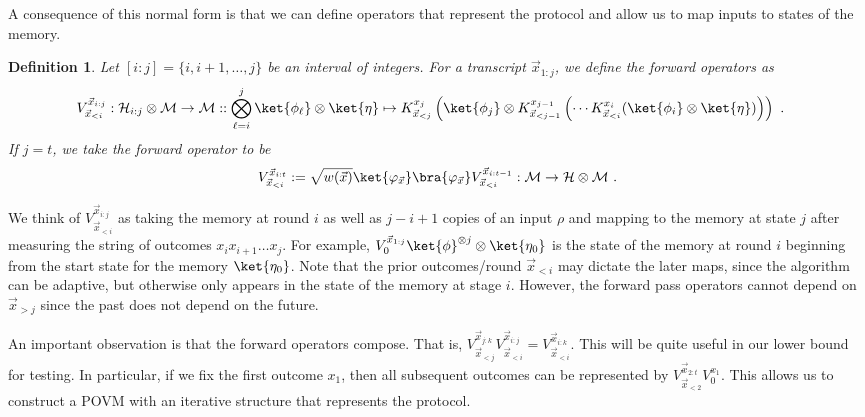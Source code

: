 \documentclass[11pt]{article}
\newtheorem{definition}[theorem]{Definition}
\newcommand{\xll}{\vec{x}_{<i}}
\newcommand{\Hc}{\mathcal{H}}
\newcommand{\Mc}{\mathcal{M}}
\begin{document}
A consequence of this normal form is that we can define operators that represent the protocol and allow us to map inputs to states of the memory.

\begin{definition}\label{def:pass_operators}
    Let $[i:j] = \{i,i+1,\ldots,j\}$ be an interval of integers. For a transcript $\vec{x}_{1:j}$, we define the forward operators as
    \begin{align}
        V^{\vec{x}_{i:j}}_{\vec{x}_{< i}} & : \Hc_{i:j} \otimes \Mc \rightarrow \Mc:: \bigotimes_{\ell=i}^j \ket{\phi_\ell} \otimes \ket{\eta} \mapsto K_{\vec{x}_{<j}}^{x_j}\left(\ket{\phi_j}\otimes K_{\vec{x}_{<{j-1}}}^{x_{j-1}}\left(\cdots K_{\vec{x}_{<i}}^{x_i}(\ket{\phi_i}\otimes \ket{\eta}) \right) \right)\ . 
    \end{align}
    If $j=t$, we take the forward operator to be
    \begin{align}
        V^{\vec{x}_{i:t}}_{\vec{x}_{< i}} :=  \sqrt{w(\vec{x})}\ket{\varphi_{\vec{x}}}\bra{\varphi_{\vec{x}}}V_{\vec{x}_{<i}}^{\vec{x}_{i:t-1}}: \Mc \rightarrow \Hc \otimes \Mc\ .
    \end{align}
\end{definition}
We think of $V_{\xll}^{\vec{x}_{i:j}}$ as taking the memory at round $i$ as well as $j-i+1$ copies of an input $\rho$ and mapping to the memory at state $j$ after measuring the string of outcomes $x_{i}x_{i+1}\ldots x_{j}$. For example, $V_0^{\vec{x}_{1:j}} \ket{\phi}^{\otimes j}\otimes \ket{\eta_0}$ is the state of the memory at round $i$ beginning from the start state for the memory $\ket{\eta_0}$.  Note that the prior outcomes/round $\vec{x}_{< i}$ may dictate the later maps, since the algorithm can be adaptive, but otherwise only appears in the state of the memory at stage $i$. However, the forward pass operators cannot depend on $\vec{x}_{>j}$ since the past does not depend on the future.

An important observation is that the forward operators compose. That is, $V_{\vec{x}_{<j}}^{\vec{x}_{j:k}}V_{\vec{x}_{<i}}^{\vec{x}_{i:j}} = V_{\vec{x}_{<i}}^{\vec{x}_{i:k}}$. This will be quite useful in our lower bound for testing. In particular, if we fix the first outcome $x_1$, then all subsequent outcomes can be represented by $V_{\vec{x}_{<2}}^{\vec{x}_{2:t}}V_{0}^{x_1}$. This allows us to construct a POVM with an iterative structure that represents the protocol.
\end{document}
